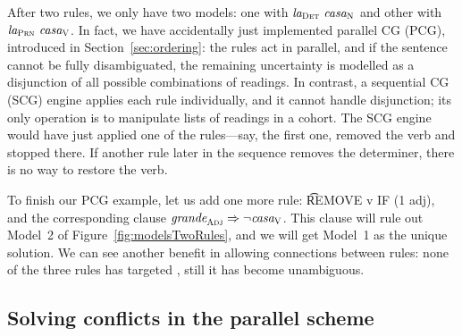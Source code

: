 After two rules, we only have two models: one with $\text{\em la}_{\text{\sc Det}} \ \text{\em casa}_{\text{\sc N}}$ and other with $\text{\em la}_{\text{\sc Prn}} \ \text{\em casa}_{\text{\sc V}}$. 
In fact, we have accidentally just implemented parallel CG (PCG), introduced in Section~\ref{sec:ordering}: the rules act in parallel, and if the sentence cannot be fully disambiguated, the remaining uncertainty is modelled as a disjunction of all possible combinations of readings.
In contrast, a sequential CG (SCG) engine applies each rule individually, and it cannot handle disjunction; its only operation is to manipulate lists of readings in a cohort.
The SCG engine would have just applied one of the rules---say, the first one, removed the verb and stopped there. If another rule later in the sequence removes the determiner, there is no way to restore the verb. 

To finish our PCG example, let us add one more rule: \t{REMOVE v IF (1 adj)}, and the corresponding clause $\text{\em grande}_{\text{\sc Adj}} \Rightarrow \neg \text{\em casa}_{\text{\sc V}}$. This clause will rule out Model~2 of Figure~\ref{fig:modelsTwoRules}, and we will get Model~1 as the unique solution. 
We can see another benefit in allowing connections between rules: none of the three rules has targeted \la{}, still it has become unambiguous. 





\subsection{Solving conflicts in the parallel scheme}
\label{sec:parallelScheme}

